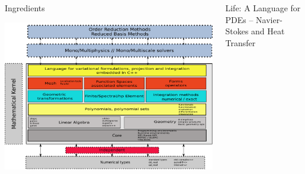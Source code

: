 \documentclass[final,utf8,,hyperref={pdfpagelabels=false}]{beamer}
\begin{document}
\begin{frame}[containsverbatim]{}
\begin{columns}[t]
    \begin{block}{Ingredients}
      \centerline{\includegraphics[width=\linewidth]{arch2.pdf}}
    \end{block}
    \vfill
    \begin{block}{Life: A Language for PDEs -- Navier-Stokes and Heat Transfer}
   

\end{block}
\end{columns}
\end{frame}
\end{document}
